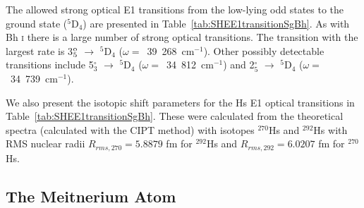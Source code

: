 \documentclass[8pt,a4paper, twoside]{report}
\begin{document}
The allowed strong optical E1 transitions from the low-lying odd states to the ground state ($^5$D$_{4}$) are presented in Table~\ref{tab:SHEE1transitionSgBh}. As with Bh \textsc{i} there is a large number of strong optical transitions. The transition with the largest rate is 3$_5^{\rm o}$ $\rightarrow$ $^5$D$_{4}$ ($\omega =$~39~268~cm$^{-1}$). Other possibly detectable transitions include 5$_3^{\circ}$ $\rightarrow$ $^5$D$_{4}$ ($\omega =$~34~812~cm$^{-1}$) and 2$_5^{\circ}$ $\rightarrow$ $^5$D$_{4}$ ($\omega= $~34~739~cm$^{-1}$).

We also present the isotopic shift parameters for the Hs E1 optical transitions in Table~\ref{tab:SHEE1transitionSgBh}. These were calculated from the theoretical spectra (calculated with the CIPT method) with isotopes $^{270}$Hs and $^{292}$Hs with RMS nuclear radii $R_{rms,\text{270}} = 5.8879$ fm for $^{292}$Hs and $R_{rms,\text{292}} = 6.0207$ fm for $^{270}$Hs.

\subsection{The Meitnerium Atom} \label{sec:Mt}
\end{document}
